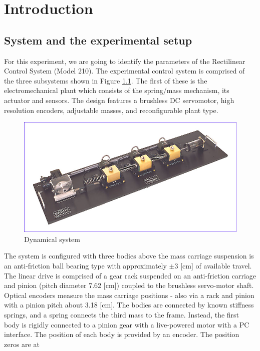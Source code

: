 \chapter{Introduction}
\label{chap:Introduction}

\section{System and the experimental setup}
\label{sec:intro1}

For this experiment, we are going to identify the parameters of the Rectilinear
Control System (Model 210).
The experimental control system is comprised of the three subsystems shown in 
Figure \ref{fig:dynamicalsystem}. The first of these is the electromechanical 
plant which consists of the spring/mass mechanism, its actuator and sensors. 
The design features a brushless DC servomotor, high resolution encoders, 
adjustable masses, and reconfigurable plant type.
%
\begin{figure}[ht]
\centering
\includegraphics[width=0.8\linewidth]{linlrge}
\caption{Dynamical system}
\label{fig:dynamicalsystem}
\end{figure}
%
The system is configured with three bodies above the mass carriage suspension 
is an anti-friction ball bearing type with approximately $\pm 3$ 
[\si{\centi\meter}] of available travel. 
The linear drive is comprised of a gear rack suspended on an anti-friction 
carriage and pinion (pitch diameter 7.62 [\si{\centi\meter}]) coupled to the 
brushless servo-motor shaft.\\ Optical encoders measure the mass carriage 
positions - also via a rack and pinion with a pinion pitch about 3.18 
[\si{\centi\meter}].
The bodies are connected by known stiffness springs, and a spring connects the 
third mass to the frame. Instead, the first body is rigidly connected to a 
pinion gear with a live-powered motor with a PC interface.
The position of each body is provided by an encoder. The position zeros are at 
